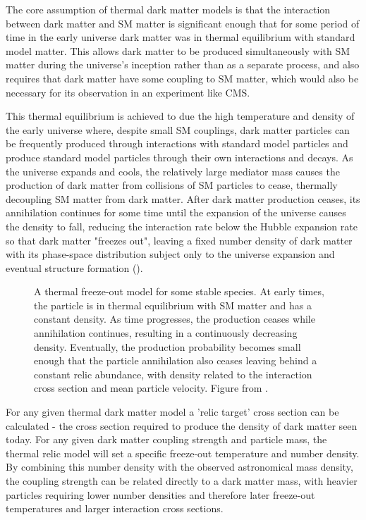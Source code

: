 The core assumption of thermal dark matter models is that the interaction between dark matter and SM matter is significant enough that for some period of time in the early universe dark matter was in thermal equilibrium with standard model matter.
This allows dark matter to be produced simultaneously with SM matter during the universe's inception rather than as a separate process, and also requires that dark matter have some coupling to SM matter, which would also be necessary for its observation in an experiment like CMS.

This thermal equilibrium is achieved to due the high temperature and density of the early universe where, despite small SM couplings, dark matter particles can be frequently produced through interactions with standard model particles and produce standard model particles through their own interactions and decays.
As the universe expands and cools, the relatively large mediator mass causes the production of dark matter from collisions of SM particles to cease, thermally decoupling SM matter from dark matter.
After dark matter production ceases, its annihilation continues for some time until the expansion of the universe causes the density to fall, reducing the interaction rate below the Hubble expansion rate so that dark matter "freezes out", leaving a fixed number density of dark matter with its phase-space distribution subject only to the universe expansion and eventual structure formation \cite{thermalDM} ().

\begin{figure}
	\label{fig:freezeout}
	\centering
	\caption[Thermal Freeze-Out]{A thermal freeze-out model for some stable species. At early times, the particle is in thermal equilibrium with SM matter and has a constant density. As time progresses, the production ceases while annihilation continues, resulting in a continuously decreasing density. Eventually, the production probability becomes small enough that the particle annihilation also ceases leaving behind a constant relic abundance, with density related to the interaction cross section and mean particle velocity. Figure from \cite{hooper2009tasi}.}
\end{figure}

For any given thermal dark matter model a 'relic target' cross section can be calculated - the cross section required to produce the density of dark matter seen today.
For any given dark matter coupling strength and particle mass, the thermal relic model will set a specific freeze-out temperature and number density.
By combining this number density with the observed astronomical mass density, the coupling strength can be related directly to a dark matter mass, with heavier particles requiring lower number densities and therefore later freeze-out temperatures and larger interaction cross sections.

